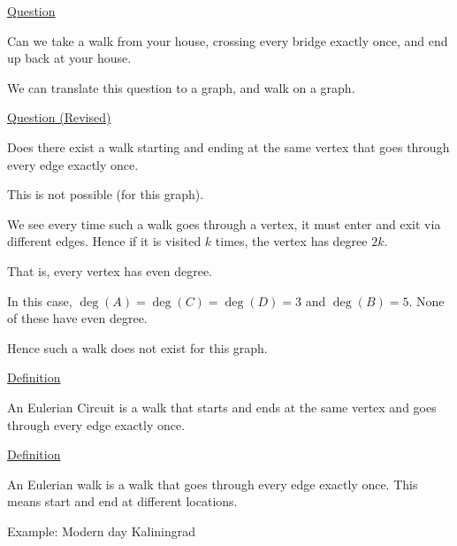 \documentclass{article}
\begin{document}
\underline{Question}

Can we take a walk from your house, crossing every bridge exactly once, and end up back at your house. 

We can translate this question to a graph, and walk on a graph. 

\begin{center}
\end{center}

\underline{Question (Revised)}

Does there exist a walk starting and ending at the same vertex that goes through every edge exactly once. 

This is not possible (for this graph). 

We see every time such a walk goes through a vertex, it must enter and exit via different edges. Hence if it is visited $k$ times, the vertex has degree $2k$.

That is, every vertex has even degree. 

In this case, $\deg(A) = \deg(C) = \deg(D) = 3$ and $\deg(B) = 5$. None of these have even degree. 

Hence such a walk does not exist for this graph. 

\underline{Definition}

An Eulerian Circuit is a walk that starts and ends at the same vertex and goes through every edge exactly once. 

\underline{Definition}

An Eulerian walk is a walk that goes through every edge exactly once. This means start and end at different locations. 

Example: Modern day Kaliningrad
\end{document}
